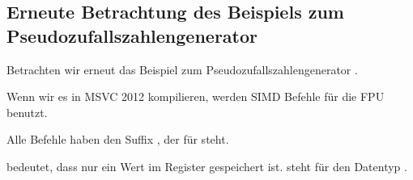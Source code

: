 \subsection{Erneute Betrachtung des Beispiels zum Pseudozufallszahlengenerator}
\label{FPU_PRNG_SIMD}

Betrachten wir erneut das Beispiel zum Pseudozufallszahlengenerator .

Wenn wir es in MSVC 2012 kompilieren, werden SIMD Befehle für die FPU benutzt.



Alle Befehle haben den Suffix , der für  steht.

 bedeutet, dass nur ein Wert im Register gespeichert ist.
 steht für den Datentyp \Tfloat.

